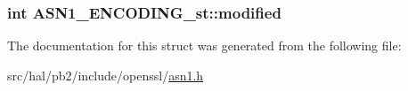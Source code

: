 \subsubsection[{\texorpdfstring{modified}{modified}}]{\setlength{\rightskip}{0pt plus 5cm}int A\+S\+N1\+\_\+\+E\+N\+C\+O\+D\+I\+N\+G\+\_\+st\+::modified}\hypertarget{struct_a_s_n1___e_n_c_o_d_i_n_g__st_a81a85e0aa68d4a31fe277f88d7f1fdd5}{}\label{struct_a_s_n1___e_n_c_o_d_i_n_g__st_a81a85e0aa68d4a31fe277f88d7f1fdd5}


The documentation for this struct was generated from the following file\+:\begin{DoxyCompactItemize}
\item 
src/hal/pb2/include/openssl/\hyperlink{asn1_8h}{asn1.\+h}\end{DoxyCompactItemize}
